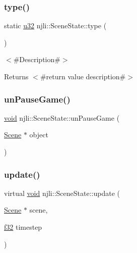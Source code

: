 \subsubsection{\texorpdfstring{type()}{type()}}
{\footnotesize\ttfamily static \mbox{\hyperlink{_util_8h_a10e94b422ef0c20dcdec20d31a1f5049}{u32}} njli\+::\+Scene\+State\+::type (\begin{DoxyParamCaption}{ }\end{DoxyParamCaption})\hspace{0.3cm}{\ttfamily [static]}}

$<$\#\+Description\#$>$

\begin{DoxyReturn}{Returns}
$<$\#return value description\#$>$ 
\end{DoxyReturn}
\mbox{\label{classnjli_1_1_scene_state_af9864d565dcf4da79041560e0167e0e3}} 
\subsubsection{\texorpdfstring{un\+Pause\+Game()}{unPauseGame()}}
{\footnotesize\ttfamily \mbox{\hyperlink{_thread_8h_af1e856da2e658414cb2456cb6f7ebc66}{void}} njli\+::\+Scene\+State\+::un\+Pause\+Game (\begin{DoxyParamCaption}\item[{\mbox{\hyperlink{classnjli_1_1_scene}{Scene}} $\ast$}]{object }\end{DoxyParamCaption})}

\mbox{\label{classnjli_1_1_scene_state_afa0b086c1bf0a41bf9caf7408ce2d324}} 
\subsubsection{\texorpdfstring{update()}{update()}}
{\footnotesize\ttfamily virtual \mbox{\hyperlink{_thread_8h_af1e856da2e658414cb2456cb6f7ebc66}{void}} njli\+::\+Scene\+State\+::update (\begin{DoxyParamCaption}\item[{\mbox{\hyperlink{classnjli_1_1_scene}{Scene}} $\ast$}]{scene,  }\item[{\mbox{\hyperlink{_util_8h_a5f6906312a689f27d70e9d086649d3fd}{f32}}}]{timestep }\end{DoxyParamCaption})\hspace{0.3cm}{\ttfamily [virtual]}}




